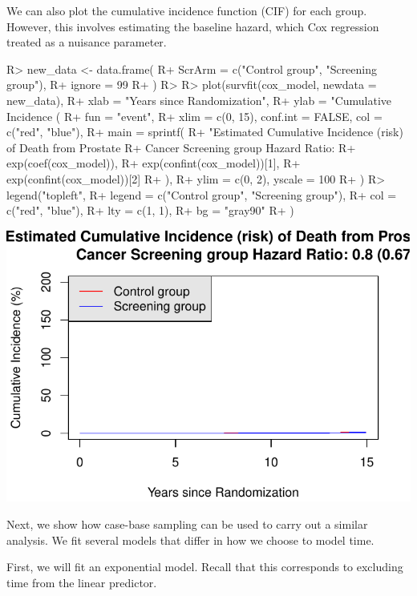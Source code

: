 \documentclass[
]{jss}
\begin{document}
We can also plot the cumulative incidence function (CIF) for each group.
However, this involves estimating the baseline hazard, which Cox
regression treated as a nuisance parameter.

\begin{CodeChunk}

\begin{CodeInput}
R> new_data <- data.frame(
R+   ScrArm = c("Control group", "Screening group"),
R+   ignore = 99
R+ )
R> 
R> plot(survfit(cox_model, newdata = new_data),
R+   xlab = "Years since Randomization",
R+   ylab = "Cumulative Incidence (%
R+   fun = "event",
R+   xlim = c(0, 15), conf.int = FALSE, col = c("red", "blue"),
R+   main = sprintf(
R+     "Estimated Cumulative Incidence (risk) of Death from Prostate 
R+                     Cancer Screening group Hazard Ratio: %
R+     exp(coef(cox_model)),
R+     exp(confint(cox_model))[1],
R+     exp(confint(cox_model))[2]
R+   ),
R+   ylim = c(0, 2), yscale = 100
R+ )
R> legend("topleft",
R+   legend = c("Control group", "Screening group"),
R+   col = c("red", "blue"),
R+   lty = c(1, 1),
R+   bg = "gray90"
R+ )
\end{CodeInput}


\begin{center}\includegraphics{../figures/erspc-cox-cif-1} \end{center}

\end{CodeChunk}

Next, we show how case-base sampling can be used to carry out a similar
analysis. We fit several models that differ in how we choose to model
time.

First, we will fit an exponential model. Recall that this corresponds to
excluding time from the linear predictor.
\end{document}
